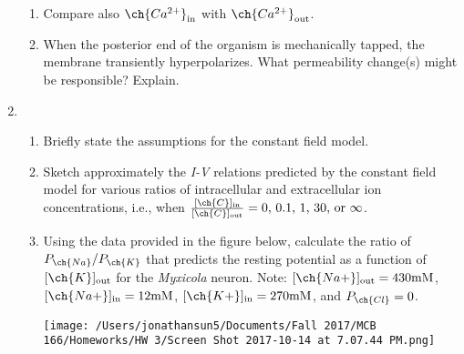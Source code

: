 \documentclass[11pt]{article}
\begin{document}
\begin{enumerate}[label=\arabic*.]
\begin{enumerate}[label=(\alph*)]
\item
Compare also $\ch{Ca^{2+}}_{\text{in}}$ with $\ch{Ca^{2+}}_{\text{out}}$.











\item
When the posterior end of the organism is mechanically tapped, the membrane transiently hyperpolarizes. What permeability change(s) might be responsible? Explain.











\end{enumerate}





\newpage
\item
\begin{enumerate}[label=(\alph*)]
\item
Briefly state the assumptions for the constant field model.



\item
Sketch approximately the \textit{I-V} relations predicted by the constant field model for various ratios of intracellular and extracellular ion concentrations, i.e., when $\frac{[\ch{C}]_{\text{in}}} {[\ch{C}]_{\text{out}}} = 0\text{, } 0.1\text{, } 1\text{, } 30\text{, or } \infty$.



\item
Using the data provided in the figure below, calculate the ratio of $P_{\ch{Na}} / P_{\ch{K}}$ that predicts the resting potential as a function of $[\ch{K}]_{\text{out}}$ for the \textit{Myxicola} neuron. Note: $[\ch{Na+}]_{\text{out}} = 430 \text{mM}$, $[\ch{Na+}]_{\text{in}} = 12 \text{mM}$, $[\ch{K+}]_{\text{in}} = 270 \text{mM}$, and $P_{\ch{Cl}} = 0$.
\begin{center}
\texttt{[image: /Users/jonathansun5/Documents/Fall 2017/MCB 166/Homeworks/HW 3/Screen Shot 2017-10-14 at 7.07.44 PM.png]}
\end{center}



\end{enumerate}














\end{enumerate}
\end{document}
